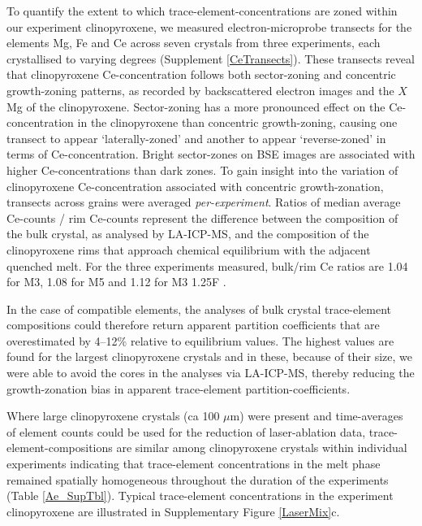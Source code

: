 \documentclass[review,authoryear,12pt]{elsarticle}
\begin{document}
To quantify the extent to which trace-element-concentrations are zoned within our experiment clinopyroxene, we measured electron-microprobe transects for the elements Mg, Fe and Ce across seven crystals from three experiments, each crystallised to varying degrees (Supplement \ref{CeTransects}). 
	These transects reveal that clinopyroxene Ce-concentration follows both sector-zoning and concentric growth-zoning patterns, as recorded by backscattered electron images and the $X$Mg of the clinopyroxene. Sector-zoning has a more pronounced effect on the Ce-concentration in the clinopyroxene than concentric growth-zoning, causing one transect to appear `laterally-zoned' and another to appear `reverse-zoned' in terms of Ce-concentration. Bright sector-zones on BSE images are associated with higher Ce-concentrations than dark zones.
To gain insight into the variation of clinopyroxene Ce-concentration associated with concentric growth-zonation, transects across grains were averaged \textit{per-experiment}. Ratios of median average Ce-counts / rim Ce-counts represent the difference between the composition of the bulk crystal, as analysed by LA-ICP-MS, and the composition of the clinopyroxene rims that approach chemical equilibrium with the adjacent quenched melt. For the three experiments measured, bulk/rim Ce ratios are 1.04 for M3, 1.08 for M5 and 1.12 for M3 1.25F \citep[from][]{Beard_PhD_thesis}. 

In the case of compatible elements, the analyses of bulk crystal trace-element compositions could therefore return apparent partition coefficients that are overestimated by 4--12$\%$ relative to equilibrium values. The highest values are found for the largest clinopyroxene crystals and in these, because of their size, we were able to avoid the cores in the analyses via LA-ICP-MS, thereby reducing the growth-zonation bias in apparent trace-element partition-coefficients.
   
Where large clinopyroxene crystals (ca 100 $\mu$m) were present and time-averages of element counts could be used for the reduction of laser-ablation data, trace-element-compositions are similar among clinopyroxene crystals within individual experiments indicating that trace-element concentrations in the melt phase remained spatially homogeneous throughout the duration of the experiments (Table \ref{Ae_SupTbl}). Typical trace-element concentrations in the experiment clinopyroxene are illustrated in Supplementary Figure \ref{LaserMix}c.

	
\end{document}
